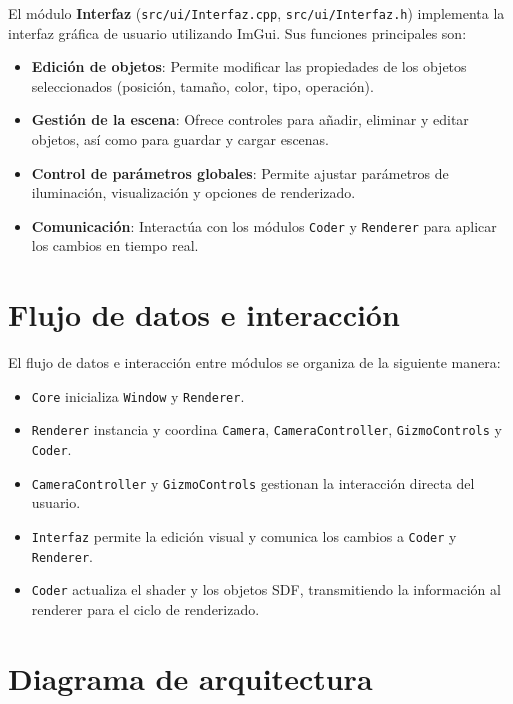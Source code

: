 El módulo \textbf{Interfaz} (\texttt{src/ui/Interfaz.cpp},
\texttt{src/ui/Interfaz.h}) implementa la interfaz gráfica de usuario
utilizando ImGui. Sus funciones principales son:
\begin{itemize}
    \item \textbf{Edición de objetos}: Permite modificar las propiedades de los objetos seleccionados (posición, tamaño, color, tipo, operación).
    \item \textbf{Gestión de la escena}: Ofrece controles para añadir, eliminar y editar objetos, así como para guardar y cargar escenas.
    \item \textbf{Control de parámetros globales}: Permite ajustar parámetros de iluminación, visualización y opciones de renderizado.
    \item \textbf{Comunicación}: Interactúa con los módulos \texttt{Coder} y \texttt{Renderer} para aplicar los cambios en tiempo real.
\end{itemize}

\section{Flujo de datos e interacción}

El flujo de datos e interacción entre módulos se organiza de la siguiente
manera:
\begin{itemize}
    \item \texttt{Core} inicializa \texttt{Window} y \texttt{Renderer}.
    \item \texttt{Renderer} instancia y coordina \texttt{Camera}, \texttt{CameraController}, \texttt{GizmoControls} y \texttt{Coder}.
    \item \texttt{CameraController} y \texttt{GizmoControls} gestionan la interacción directa del usuario.
    \item \texttt{Interfaz} permite la edición visual y comunica los cambios a \texttt{Coder} y \texttt{Renderer}.
    \item \texttt{Coder} actualiza el shader y los objetos SDF, transmitiendo la información al renderer para el ciclo de renderizado.
\end{itemize}

\section{Diagrama de arquitectura}

